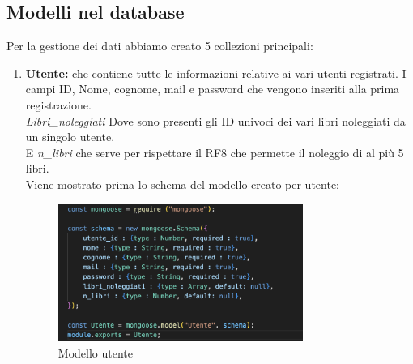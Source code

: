 \documentclass{article}
\begin{document}
\subsection{Modelli nel database}
Per la gestione dei dati abbiamo creato 5 collezioni principali:
\begin{enumerate}
    \item \textbf{Utente:} che contiene tutte le informazioni relative ai vari utenti registrati.
    I campi ID, Nome, cognome, mail e password che vengono inseriti alla prima registrazione.\\ 
    \textit{Libri\_noleggiati} Dove sono presenti gli ID univoci dei vari libri noleggiati da un singolo utente.\\
    E \textit{n\_libri} che serve per rispettare il RF8 che permette il noleggio di al più 5 libri.\\
    
    Viene mostrato prima lo schema del modello creato per utente: 
        \begin{figure}[H]
        \centering
        \includegraphics[width=80mm]{D4/Images/ModelUtente.png}
        \caption{Modello utente}
    \end{figure}
    

\end{enumerate}
\end{document}
